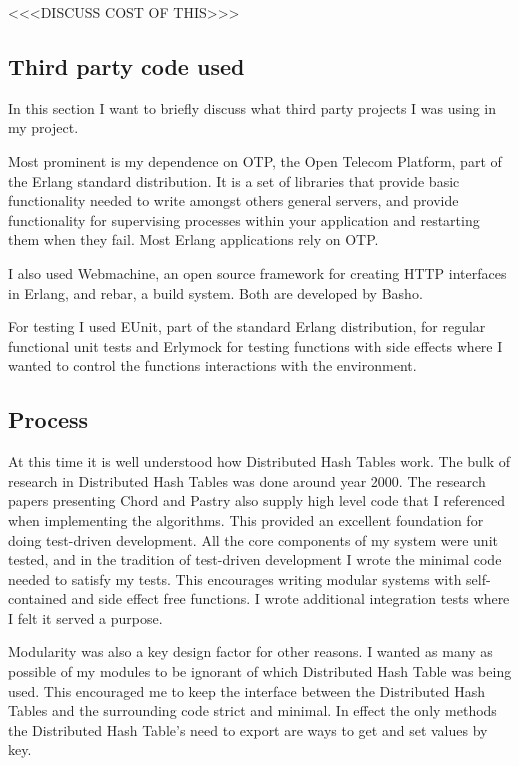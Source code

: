 <<<DISCUSS COST OF THIS>>>


\subsection{Third party code used}
In this section I want to briefly discuss what third party projects I was using in my project.

Most prominent is my dependence on OTP, the Open Telecom Platform, part of the Erlang standard distribution. It is a set of libraries that provide basic functionality needed to write amongst others general servers, and provide functionality for supervising processes within your application and restarting them when they fail. Most Erlang applications rely on OTP.

I also used Webmachine, an open source framework for creating HTTP interfaces in Erlang, and rebar, a build system. Both are developed by Basho.

For testing I used EUnit, part of the standard Erlang distribution, for regular functional unit tests and Erlymock for testing functions with side effects where I wanted to control the functions interactions with the environment.



\subsection{Process}
At this time it is well understood how Distributed Hash Tables work. The bulk of research in Distributed Hash Tables was done around year 2000. The research papers presenting Chord and Pastry also supply high level code that I referenced when implementing the algorithms. This provided an excellent foundation for doing test-driven development. All the core components of my system were unit tested, and in the tradition of test-driven development I wrote the minimal code needed to satisfy my tests. This encourages writing modular systems with self-contained and side effect free functions.
I wrote additional integration tests where I felt it served a purpose.

Modularity was also a key design factor for other reasons. I wanted as many as possible of my modules to be ignorant of which Distributed Hash Table was being used. This encouraged me to keep the interface between the Distributed Hash Tables and the surrounding code strict and minimal. In effect the only methods the Distributed Hash Table's need to export are ways to get and set values by key.


